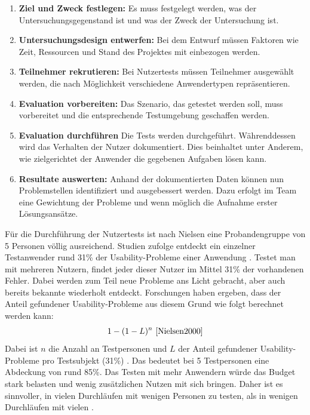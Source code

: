 \begin{enumerate}
	\item \textbf{Ziel und Zweck festlegen:} Es muss festgelegt werden, was der Untersuchungsgegenstand ist und was der Zweck der Untersuchung ist.
	\item \textbf{Untersuchungsdesign entwerfen:} Bei dem Entwurf müssen Faktoren wie Zeit, Ressourcen und Stand des Projektes mit einbezogen werden.
	\item \textbf{Teilnehmer rekrutieren:} Bei Nutzertests müssen Teilnehmer ausgewählt werden, die nach Möglichkeit verschiedene Anwendertypen repräsentieren.
	\item \textbf{Evaluation vorbereiten:} Das Szenario, das getestet werden soll, muss vorbereitet und die entsprechende Testumgebung geschaffen werden.
	\item \textbf{Evaluation durchführen} Die Tests werden durchgeführt. Währenddessen wird das Verhalten der Nutzer dokumentiert. Dies beinhaltet unter Anderem, wie zielgerichtet der Anwender die gegebenen Aufgaben lösen kann.
	\item \textbf{Resultate auswerten:} Anhand der dokumentierten Daten können nun Problemstellen identifiziert und ausgebessert werden. Dazu erfolgt im Team eine Gewichtung der Probleme und wenn möglich die Aufnahme erster Lösungsansätze.
\end{enumerate}
Für die Durchführung der Nutzertests ist nach Nielsen eine Probandengruppe von 5 Personen völlig ausreichend. Studien zufolge entdeckt ein einzelner Testanwender rund 31\% der Usability-Probleme einer Anwendung \cite{Nielsen2000}. Testet man mit mehreren Nutzern, findet jeder dieser Nutzer im Mittel 31\% der vorhandenen Fehler. Dabei werden zum Teil neue Probleme ans Licht gebracht, aber auch bereits bekannte wiederholt entdeckt. Forschungen haben ergeben, dass der Anteil gefundener Usability-Probleme aus diesem Grund wie folgt berechnet werden kann:
\begin{equation}
			1-(1-L)^n\text{ \cite{Nielsen2000}}
\end{equation}
Dabei ist \(n\) die Anzahl an Testpersonen und \(L\) der Anteil gefundener Usability-Probleme pro Testsubjekt (31\%) \cite{Nielsen2000}. Das bedeutet bei 5 Testpersonen eine Abdeckung von rund 85\%. Das Testen mit mehr Anwendern würde das Budget stark belasten und wenig zusätzlichen Nutzen mit sich bringen. Daher ist es sinnvoller, in vielen Durchläufen mit wenigen Personen zu testen, als in wenigen Durchläufen mit vielen \cite{Nielsen2000}.\par
